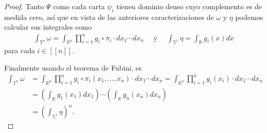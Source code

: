 \documentclass[11pt]{article}
\newcommand{\R}{\mathbb{R}}
\newcommand{\Ss}{\mathbb{S}}
\newcommand{\T}{\mathbb{T}}
\newcommand{\nat}[1]{[\![#1]\!]}
\begin{document}
\begin{proof}
Tanto $\Psi$ como cada carta $\psi_i$ tienen dominio denso cuyo complemento es de medida cero, así que en vista de las anteriores caracterizaciones de $\omega$ y $\eta$ podemos calcular sus integrales como
\begin{align*}
\int_{\T^n}\omega = \int_{\R^n}\prod_{i = 1}^{n}g_i \circ \pi_i \cdot dx_1 \cdots dx_n \quad  \text{ y } \quad \int_{\Ss^1} \eta = \int_{\R}g_i(x)dx
\end{align*}
para cada $i \in \nat{n}$.

Finalmente usando el teorema de Fubini, es
\begin{align*}
\int_{\T^n}\omega &= \int_{\R^n}\prod_{i = 1}^{n}g_i \circ \pi_i(x_1, \dots, x_n) \cdot dx_1 \cdots dx_n = \int_{\R^n}\prod_{i = 1}^{n}g_i(x_i) \cdot dx_1 \cdots dx_n\\
&= \left(\int_{\R}g_1(x_1)dx_1\right) \cdots \left(\int_{\R}g_n(x_n)dx_n\right)\\
&= \left(\int_{\Ss^1} \eta\right)^n.
\end{align*}
\end{proof}
\end{document}
